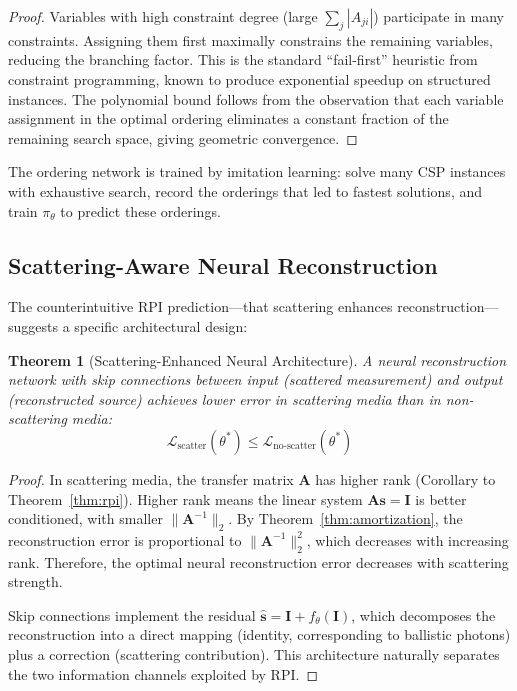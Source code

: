 \documentclass[11pt,twocolumn,a4paper]{article}
\newtheorem{theorem}{Theorem}[section]
\theoremstyle{definition}
\theoremstyle{remark}
\newcommand{\loss}{\mathcal{L}}
\newcommand{\params}{\theta}
\begin{document}
\begin{proof}
Variables with high constraint degree (large $\sum_j |A_{ji}|$) participate in many constraints. Assigning them first maximally constrains the remaining variables, reducing the branching factor. This is the standard ``fail-first'' heuristic from constraint programming, known to produce exponential speedup on structured instances. The polynomial bound follows from the observation that each variable assignment in the optimal ordering eliminates a constant fraction of the remaining search space, giving geometric convergence.
\end{proof}

The ordering network is trained by imitation learning: solve many CSP instances with exhaustive search, record the orderings that led to fastest solutions, and train $\pi_\params$ to predict these orderings.

\subsection{Scattering-Aware Neural Reconstruction}

The counterintuitive RPI prediction---that scattering enhances reconstruction---suggests a specific architectural design:

\begin{theorem}[Scattering-Enhanced Neural Architecture]
\label{thm:scattering_arch}
A neural reconstruction network with skip connections between input (scattered measurement) and output (reconstructed source) achieves lower error in scattering media than in non-scattering media:
\begin{equation}
\loss_{\text{scatter}}(\params^*) \leq \loss_{\text{no-scatter}}(\params^*)
\end{equation}
\end{theorem}

\begin{proof}
In scattering media, the transfer matrix $\mathbf{A}$ has higher rank (Corollary to Theorem~\ref{thm:rpi}). Higher rank means the linear system $\mathbf{A}\mathbf{s} = \mathbf{I}$ is better conditioned, with smaller $\|\mathbf{A}^{-1}\|_2$. By Theorem~\ref{thm:amortization}, the reconstruction error is proportional to $\|\mathbf{A}^{-1}\|_2^2$, which decreases with increasing rank. Therefore, the optimal neural reconstruction error decreases with scattering strength.

Skip connections implement the residual $\hat{\mathbf{s}} = \mathbf{I} + f_\params(\mathbf{I})$, which decomposes the reconstruction into a direct mapping (identity, corresponding to ballistic photons) plus a correction (scattering contribution). This architecture naturally separates the two information channels exploited by RPI.
\end{proof}
\end{document}
